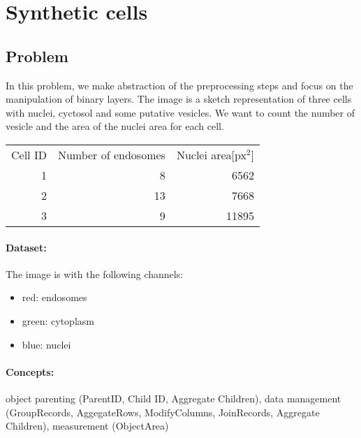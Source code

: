 \section{Synthetic cells}

\subsection{Problem}
In this problem, we make abstraction of the preprocessing steps and focus on the manipulation of binary layers. The image is a sketch representation of three cells with nuclei, cyctosol and some putative vesicles. We want to count the number of vesicle and the area of the nuclei area for each cell.

\begin{center}
\begin{tabular}{rrr}
    Cell ID& Number of endosomes& Nuclei area[px$^2$]\\
    1&8&6562\\
    2&13&7668\\
    3&9&11895\\
\end{tabular}   
\end{center}

\paragraph{Dataset:} The image is  with the following channels:
\begin{itemize}\setlength\itemsep{0em}
    \item red: endosomes
    \item green: cytoplasm
    \item blue: nuclei
\end{itemize}

\paragraph{Concepts:} object parenting (ParentID, Child ID, Aggregate Children), data management (GroupRecords, AggegateRows, ModifyColumns, JoinRecords, Aggregate Children), measurement (ObjectArea)


